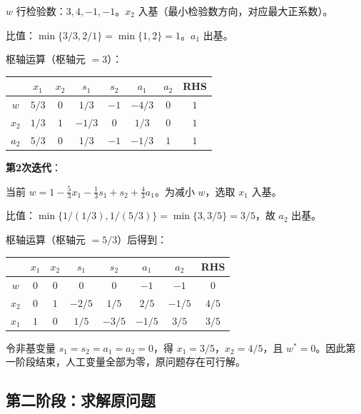 \begin{example}
$w$ 行检验数：$3, 4, -1, -1$。$x_2$ 入基（最小检验数方向，对应最大正系数）。

比值：$\min\{3/3, 2/1\} = \min\{1, 2\} = 1$。$a_1$ 出基。

枢轴运算（枢轴元 $= 3$）：

\begin{table}[H]
\centering
\begin{tabular}{@{}c|cccccc|c@{}}
\toprule
& $x_1$ & $x_2$ & $s_1$ & $s_2$ & $a_1$ & $a_2$ & RHS \\
\midrule
$w$ & $5/3$ & $0$ & $1/3$ & $-1$ & $-4/3$ & $0$ & $1$ \\
\midrule
$x_2$ & $1/3$ & $1$ & $-1/3$ & $0$ & $1/3$ & $0$ & $1$ \\
$a_2$ & $5/3$ & $0$ & $1/3$ & $-1$ & $-1/3$ & $1$ & $1$ \\
\bottomrule
\end{tabular}
\end{table}

\textbf{第2次迭代}：

当前 $w = 1 - \frac{5}{3}x_1 - \frac{1}{3}s_1 + s_2 + \frac{4}{3}a_1$。为减小 $w$，选取 $x_1$ 入基。

比值：$\min\{1/(1/3), 1/(5/3)\} = \min\{3, 3/5\} = 3/5$，故 $a_2$ 出基。

枢轴运算（枢轴元 $=5/3$）后得到：

\begin{table}[H]
\centering
\begin{tabular}{@{}c|cccccc|c@{}}
\toprule
& $x_1$ & $x_2$ & $s_1$ & $s_2$ & $a_1$ & $a_2$ & RHS \\
\midrule
$w$ & $0$ & $0$ & $0$ & $0$ & $-1$ & $-1$ & $0$ \\
\midrule
$x_2$ & $0$ & $1$ & $-2/5$ & $1/5$ & $2/5$ & $-1/5$ & $4/5$ \\
$x_1$ & $1$ & $0$ & $1/5$ & $-3/5$ & $-1/5$ & $3/5$ & $3/5$ \\
\bottomrule
\end{tabular}
\end{table}

令非基变量 $s_1=s_2=a_1=a_2=0$，得 $x_1=3/5$，$x_2=4/5$，且 $w^*=0$。因此第一阶段结束，人工变量全部为零，原问题存在可行解。
\end{example}

\subsection{第二阶段：求解原问题}

